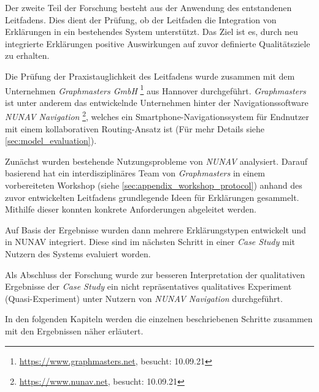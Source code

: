 \bigbreak

Der zweite Teil der Forschung besteht aus der Anwendung des entstandenen Leitfadens. Dies dient der Prüfung, ob der Leitfaden die Integration von Erklärungen in ein bestehendes System unterstützt. Das Ziel ist es, durch neu integrierte Erklärungen positive Auswirkungen auf zuvor definierte Qualitätsziele zu erhalten.

Die Prüfung der Praxistauglichkeit des Leitfadens wurde zusammen mit dem Unternehmen \textit{Graphmasters GmbH} \footnote{\url{https://www.graphmasters.net}, besucht: 10.09.21} aus Hannover durchgeführt. \textit{Graphmasters} ist unter anderem das entwickelnde Unternehmen hinter der Navigationssoftware \textit{NUNAV Navigation} \footnote{\url{https://www.nunav.net}, besucht: 10.09.21}, welches ein Smartphone-Navigationssystem für Endnutzer mit einem kollaborativen Routing-Ansatz ist (Für mehr Details siehe \autoref{sec:model_evaluation}).

Zunächst wurden bestehende Nutzungsprobleme von \textit{NUNAV} analysiert. Darauf basierend hat ein interdisziplinäres Team von \textit{Graphmasters} in einem vorbereiteten Workshop (siehe \autoref{sec:appendix_workshop_protocol}) anhand des zuvor entwickelten Leitfadens grundlegende Ideen für Erklärungen gesammelt. Mithilfe dieser konnten konkrete Anforderungen abgeleitet werden.

Auf Basis der Ergebnisse wurden dann mehrere Erklärungstypen entwickelt und in NUNAV integriert. Diese sind im nächsten Schritt in einer \textit{Case Study} mit Nutzern des Systems evaluiert worden.

Als Abschluss der Forschung wurde zur besseren Interpretation der qualitativen Ergebnisse der \textit{Case Study} ein nicht repräsentatives qualitatives Experiment (Quasi-Experiment) unter Nutzern von \textit{NUNAV Navigation} durchgeführt.

\bigskip

In den folgenden Kapiteln werden die einzelnen beschriebenen Schritte zusammen mit den Ergebnissen näher erläutert.